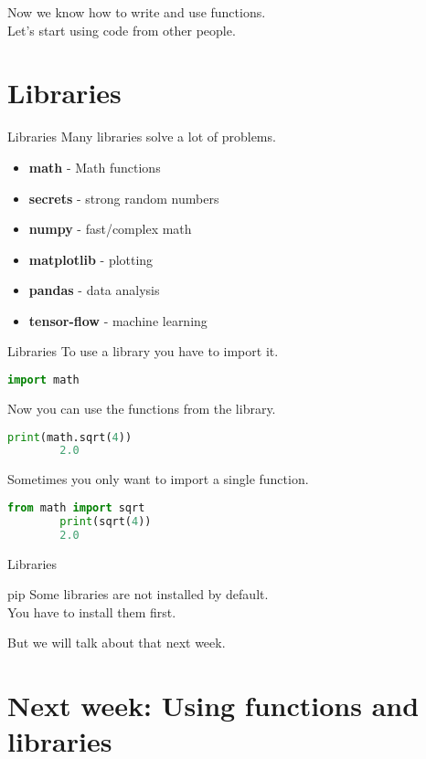 \documentclass{beamer}
\begin{document}
\begin{frame}
    Now we know how to write and use functions.\\ \pause
    Let's start using code from other people.
\end{frame}

\section{Libraries}

\begin{frame}{Libraries}
    Many libraries solve a lot of problems.\\ \pause
    \begin{itemize}
        \item \textbf{math} - Math functions
        \item \textbf{secrets} - strong random numbers
        \item \textbf{numpy} - fast/complex math
        \item \textbf{matplotlib} - plotting
        \item \textbf{pandas} - data analysis
        \item \textbf{tensor-flow} - machine learning
    \end{itemize}
\end{frame}

\begin{frame}[fragile]{Libraries}
    To use a library you have to import it.\\ \pause
    \begin{lstlisting}[backgroundcolor = \color{lightgray},language=Python]
        import math
    \end{lstlisting}
    \pause
    Now you can use the functions from the library.\\ \pause
    \begin{lstlisting}[backgroundcolor = \color{lightgray},language=Python]
        print(math.sqrt(4))
        2.0
    \end{lstlisting}
    Sometimes you only want to import a single function.\\ \pause
    \begin{lstlisting}[backgroundcolor = \color{lightgray},language=Python]
        from math import sqrt
        print(sqrt(4))
        2.0
    \end{lstlisting}
\end{frame}


\begin{frame}{Libraries}
    \begin{alertblock}{pip}
        Some libraries are not installed by default.\\
        You have to install them first.
    \end{alertblock}
    But we will talk about that next week.
\end{frame}

\section{Next week: Using functions and libraries}
\end{document}
